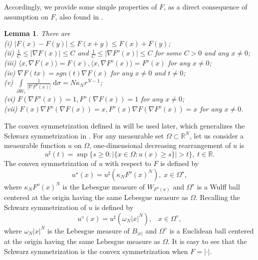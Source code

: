 \documentclass[11pt]{article}
\theoremstyle{plain}
\newtheorem{lemma}[theorem]{Lemma}
\numberwithin{equation}{section}
\newcommand{\R}{\mathbb{R}}
\begin{document}
Accordingly, we provide some simple properties of $F$, as a direct consequence of assumption on $F$, also found in \cite{Bellettini-Paolini-1996,Ferone-Kawohl-2009,Wang-Xia-2011,Wang-Xia-2012}.
\begin{lemma}\label{le2.1}
There are\\
\textup{(i)} $\lvert F(x)-F(y)\rvert\leq F(x+y)\leq F(x)+F(y)$\textup{;}\\
\textup{(ii)} $\frac{1}{C}\leq\lvert\nabla F(x)\rvert\leq C$ and $\frac{1}{C}\leq \lvert\nabla F^{o}(x)\rvert\leq C$ for some $C>0$ and any $x\neq0$\textup{;}\\
\textup{(iii)} $\langle x,\nabla F(x)\rangle=F(x), \langle x, \nabla F^{o}(x)\rangle = F^{o}(x)$ for any $x\neq 0$\textup{;}\\
\textup{(iv)} $\nabla F(tx)=sgn(t)\nabla F(x)$ for any $x\neq 0$ and $t\neq 0$\textup{;}\\
\textup{(v)} $\int\limits_{\partial W_r}\frac{1}{|\nabla F^{o}(x)|}\;\mathrm{d}\sigma= N\kappa_Nr^{N-1}$\textup{;}\\
\textup{(vi)} $F(\nabla F^{o}(x))=1, F^{o}(\nabla F(x))=1$   for any $x\neq 0$\textup{;}\\
\textup{(vii)} $F(x)\nabla F^{o}(\nabla F(x))=x, F^{o}(x)\nabla F(\nabla F^{o}(x))=x$ for any $x\neq 0$.
\end{lemma}

The convex symmetrization defined in \cite{Alvino-Ferone-Trombetti-Lions-1997} will be used later, which generalizes the Schwarz symmetrization in \cite{Talenti-1976}. For any measurable set $\Omega\subset\R^{N}$, let us consider a measurable function $u$ on $\Omega$, one-dimensional decreasing rearrangement of $u$ is
$$
u^{\sharp}(t)=\sup\{s\geq 0:\lvert\{x\in\Omega:u(x)\geq s\}\rvert >t\},\;t\in\R.
$$
The convex symmetrization of $u$ with respect to $F$ is defined by
$$
u^{\star}(x)=u^{\sharp}\left(\kappa_{N}F^{o}(x)^{N}\right),\;x\in\Omega^{\star},
$$
where $\kappa_{N}F^{o}(x)^{N}$ is the Lebesgue measure of $W_{F^{o}(x)}$ and $\Omega^{\star}$ is a Wulff ball centered at the origin having the same Lebesgue measure as $\Omega$. Recalling the Schwarz symmetrization of $u$ is defined by
$$
u^{\diamond}(x)=u^{\sharp}(\omega_{N}\lvert x\rvert^{N}),\;\;\;x\in\Omega^{\diamond},
$$
where $\omega_{N}\lvert x\rvert^{N}$ is the Lebesgue measure of $B_{\lvert x\rvert}$ and $\Omega^{\diamond}$ is a Euclidean ball centered at the origin having the same Lebesgue measure as $\Omega$. It is easy to see that the Schwarz symmetrization is the convex symmetrization when $F=\lvert\cdot\rvert$.
\end{document}

